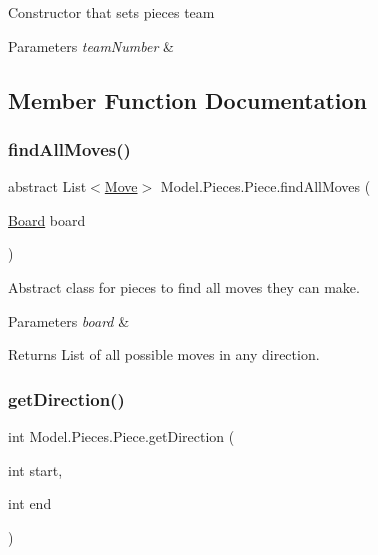 Constructor that sets piece\textquotesingle{}s team


\begin{DoxyParams}{Parameters}
{\em team\+Number} & \\
\hline
\end{DoxyParams}


\subsection{Member Function Documentation}
\hypertarget{class_model_1_1_pieces_1_1_piece_a0f87f230aee0300a8b88570ce7621a36}{}\label{class_model_1_1_pieces_1_1_piece_a0f87f230aee0300a8b88570ce7621a36} 
\subsubsection{\texorpdfstring{find\+All\+Moves()}{findAllMoves()}}
{\footnotesize\ttfamily abstract List$<$\hyperlink{class_model_1_1_move}{Move}$>$ Model.\+Pieces.\+Piece.\+find\+All\+Moves (\begin{DoxyParamCaption}\item[{\hyperlink{class_model_1_1_board}{Board}}]{board }\end{DoxyParamCaption})\hspace{0.3cm}{\ttfamily [abstract]}}

Abstract class for pieces to find all moves they can make. 
\begin{DoxyParams}{Parameters}
{\em board} & \\
\hline
\end{DoxyParams}
\begin{DoxyReturn}{Returns}
List of all possible moves in any direction. 
\end{DoxyReturn}
\hypertarget{class_model_1_1_pieces_1_1_piece_a236aeb47fd49b23ba097046790554ffc}{}\label{class_model_1_1_pieces_1_1_piece_a236aeb47fd49b23ba097046790554ffc} 
\subsubsection{\texorpdfstring{get\+Direction()}{getDirection()}}
{\footnotesize\ttfamily int Model.\+Pieces.\+Piece.\+get\+Direction (\begin{DoxyParamCaption}\item[{int}]{start,  }\item[{int}]{end }\end{DoxyParamCaption})}

